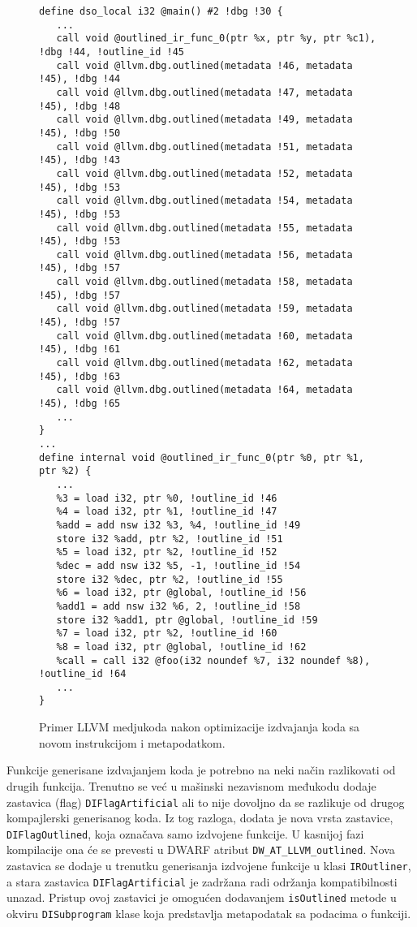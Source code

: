 \documentclass[12pt,oneside]{memoir}
\begin{document}
\begin{figure}
\begin{verbatim}
define dso_local i32 @main() #2 !dbg !30 {
   ...
   call void @outlined_ir_func_0(ptr %x, ptr %y, ptr %c1), !dbg !44, !outline_id !45
   call void @llvm.dbg.outlined(metadata !46, metadata !45), !dbg !44
   call void @llvm.dbg.outlined(metadata !47, metadata !45), !dbg !48
   call void @llvm.dbg.outlined(metadata !49, metadata !45), !dbg !50
   call void @llvm.dbg.outlined(metadata !51, metadata !45), !dbg !43
   call void @llvm.dbg.outlined(metadata !52, metadata !45), !dbg !53
   call void @llvm.dbg.outlined(metadata !54, metadata !45), !dbg !53
   call void @llvm.dbg.outlined(metadata !55, metadata !45), !dbg !53
   call void @llvm.dbg.outlined(metadata !56, metadata !45), !dbg !57
   call void @llvm.dbg.outlined(metadata !58, metadata !45), !dbg !57
   call void @llvm.dbg.outlined(metadata !59, metadata !45), !dbg !57
   call void @llvm.dbg.outlined(metadata !60, metadata !45), !dbg !61
   call void @llvm.dbg.outlined(metadata !62, metadata !45), !dbg !63
   call void @llvm.dbg.outlined(metadata !64, metadata !45), !dbg !65
   ...
}
...
define internal void @outlined_ir_func_0(ptr %0, ptr %1, ptr %2) {
   ...
   %3 = load i32, ptr %0, !outline_id !46
   %4 = load i32, ptr %1, !outline_id !47
   %add = add nsw i32 %3, %4, !outline_id !49
   store i32 %add, ptr %2, !outline_id !51
   %5 = load i32, ptr %2, !outline_id !52
   %dec = add nsw i32 %5, -1, !outline_id !54
   store i32 %dec, ptr %2, !outline_id !55
   %6 = load i32, ptr @global, !outline_id !56
   %add1 = add nsw i32 %6, 2, !outline_id !58
   store i32 %add1, ptr @global, !outline_id !59
   %7 = load i32, ptr %2, !outline_id !60
   %8 = load i32, ptr @global, !outline_id !62
   %call = call i32 @foo(i32 noundef %7, i32 noundef %8), !outline_id !64
   ...
}
\end{verbatim}
\label{lst:outlining_ir_example}
\caption{Primer LLVM medjukoda nakon optimizacije izdvajanja koda sa novom instrukcijom i metapodatkom.}
\end{figure}

Funkcije generisane izdvajanjem koda je potrebno na neki način razlikovati od drugih funkcija.
Trenutno se već u mašinski nezavisnom međukodu dodaje zastavica (flag) \verb|DIFlagArtificial| ali to nije dovoljno da se razlikuje od drugog kompajlerski generisanog koda.
Iz tog razloga, dodata je nova vrsta zastavice, \verb|DIFlagOutlined|, koja označava samo izdvojene funkcije.
U kasnijoj fazi kompilacije ona će se prevesti u DWARF atribut \verb|DW_AT_LLVM_outlined|.
Nova zastavica se dodaje u trenutku generisanja izdvojene funkcije u klasi \verb|IROutliner|, a stara zastavica \verb|DIFlagArtificial| je zadržana radi održanja kompatibilnosti unazad.
Pristup ovoj zastavici je omogućen dodavanjem \verb|isOutlined| metode u okviru \verb|DISubprogram| klase koja predstavlja metapodatak sa podacima o funkciji.
\end{document}
